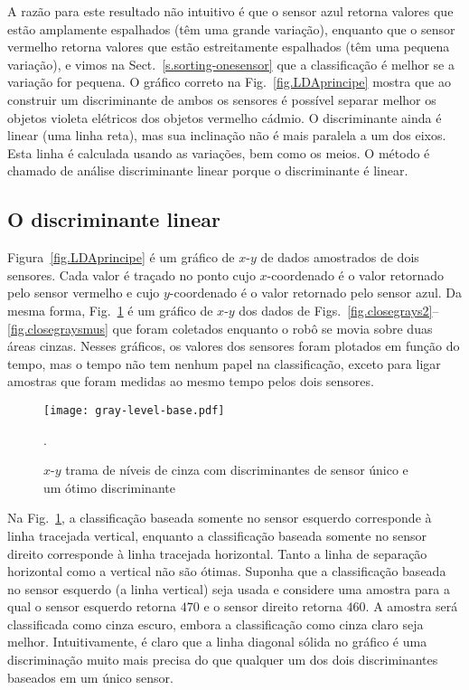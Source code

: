 A razão para este resultado não intuitivo é que o sensor azul retorna valores que estão amplamente espalhados (têm uma grande variação), enquanto que o sensor vermelho retorna valores que estão estreitamente espalhados (têm uma pequena variação), e vimos na Sect.~\ref{s.sorting-onesensor} que a classificação é melhor se a variação for pequena. O gráfico correto na Fig.~\ref{fig.LDAprincipe} mostra que ao construir um discriminante de ambos os sensores é possível separar melhor os objetos violeta elétricos dos objetos vermelho cádmio. O discriminante ainda é linear (uma linha reta), mas sua inclinação não é mais paralela a um dos eixos. Esta linha é calculada usando as variações, bem como os meios. O método é chamado de análise discriminante linear porque o discriminante é linear.

\subsection{O discriminante linear}

Figura~\ref{fig.LDAprincipe} é um gráfico de $x$-$y$ de dados amostrados de dois sensores. Cada valor é traçado no ponto cujo $x$-coordenado é o valor retornado pelo sensor vermelho e cujo $y$-coordenado é o valor retornado pelo sensor azul. Da mesma forma, Fig.~\ref{fig.gray-x-y} é um gráfico de $x$-$y$ dos dados de Figs.~\ref{fig.closegrays2}--\ref{fig.closegraysmus} que foram coletados enquanto o robô se movia sobre duas áreas cinzas.  Nesses gráficos, os valores dos sensores foram plotados em função do tempo, mas o tempo não tem nenhum papel na classificação, exceto para ligar amostras que foram medidas ao mesmo tempo pelos dois sensores.

\begin{figure}
\begin{center}
\texttt{[image: gray-level-base.pdf]}
\end{center}
\caption{$x$-$y$ trama de níveis de cinza com discriminantes de sensor único e um ótimo discriminante}\label{fig.gray-x-y}.
\end{figure}

Na Fig.~\ref{fig.gray-x-y}, a classificação baseada somente no sensor esquerdo corresponde à linha tracejada vertical, enquanto a classificação baseada somente no sensor direito corresponde à linha tracejada horizontal. Tanto a linha de separação horizontal como a vertical não são ótimas. Suponha que a classificação baseada no sensor esquerdo (a linha vertical) seja usada e considere uma amostra para a qual o sensor esquerdo retorna $470$ e o sensor direito retorna $460$. A amostra será classificada como cinza escuro, embora a classificação como cinza claro seja melhor. Intuitivamente, é claro que a linha diagonal sólida no gráfico é uma discriminação muito mais precisa do que qualquer um dos dois discriminantes baseados em um único sensor.

